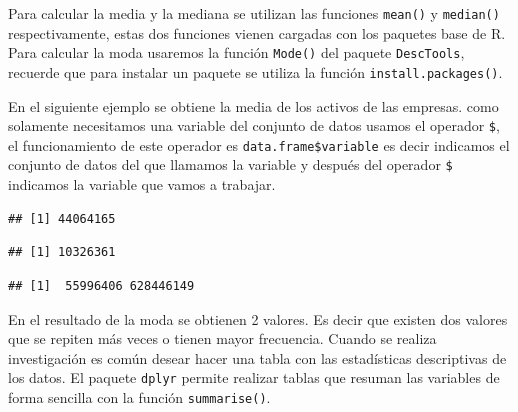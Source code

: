 \documentclass[]{book}
\newenvironment{Shaded}{\begin{snugshade}}{\end{snugshade}}
\newcommand{\KeywordTok}[1]{\textcolor[rgb]{0.13,0.29,0.53}{\textbf{#1}}}
\newcommand{\OperatorTok}[1]{\textcolor[rgb]{0.81,0.36,0.00}{\textbf{#1}}}
\newcommand{\NormalTok}[1]{#1}
\begin{document}
Para calcular la media y la mediana se utilizan las funciones
\texttt{mean()} y \texttt{median()} respectivamente, estas dos funciones
vienen cargadas con los paquetes base de R. Para calcular la moda
usaremos la función \texttt{Mode()} del paquete \texttt{DescTools},
recuerde que para instalar un paquete se utiliza la función
\texttt{install.packages()}.

En el siguiente ejemplo se obtiene la media de los activos de las
empresas. como solamente necesitamos una variable del conjunto de datos
usamos el operador \texttt{\$}, el funcionamiento de este operador es
\texttt{data.frame\$variable} es decir indicamos el conjunto de datos
del que llamamos la variable y después del operador \texttt{\$}
indicamos la variable que vamos a trabajar.

\begin{Shaded}
\end{Shaded}

\begin{verbatim}
## [1] 44064165
\end{verbatim}

\begin{Shaded}
\end{Shaded}

\begin{verbatim}
## [1] 10326361
\end{verbatim}

\begin{Shaded}
\end{Shaded}

\begin{verbatim}
## [1]  55996406 628446149
\end{verbatim}

En el resultado de la moda se obtienen 2 valores. Es decir que existen
dos valores que se repiten más veces o tienen mayor frecuencia. Cuando
se realiza investigación es común desear hacer una tabla con las
estadísticas descriptivas de los datos. El paquete \texttt{dplyr}
permite realizar tablas que resuman las variables de forma sencilla con
la función \texttt{summarise()}.
\end{document}
